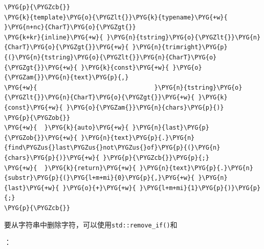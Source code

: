 \begin{codeblockbg}
\begin{Verbatim}[commandchars=\\\{\},breaklines=true,breakanywhere=true,fontsize=\codefont,xleftmargin=17bp]
\PYG{p}{\PYGZcb{}}
\PYG{k}{template}\PYG{o}{\PYGZlt{}}\PYG{k}{typename}\PYG{+w}{ }\PYG{n+nc}{CharT}\PYG{o}{\PYGZgt{}}
\PYG{k+kr}{inline}\PYG{+w}{ }\PYG{n}{tstring}\PYG{o}{\PYGZlt{}}\PYG{n}{CharT}\PYG{o}{\PYGZgt{}}\PYG{+w}{ }\PYG{n}{trimright}\PYG{p}{(}\PYG{n}{tstring}\PYG{o}{\PYGZlt{}}\PYG{n}{CharT}\PYG{o}{\PYGZgt{}}\PYG{+w}{ }\PYG{k}{const}\PYG{+w}{ }\PYG{o}{\PYGZam{}}\PYG{n}{text}\PYG{p}{,}
\PYG{+w}{                                }\PYG{n}{tstring}\PYG{o}{\PYGZlt{}}\PYG{n}{CharT}\PYG{o}{\PYGZgt{}}\PYG{+w}{ }\PYG{k}{const}\PYG{+w}{ }\PYG{o}{\PYGZam{}}\PYG{n}{chars}\PYG{p}{)}
\PYG{p}{\PYGZob{}}
\PYG{+w}{  }\PYG{k}{auto}\PYG{+w}{ }\PYG{n}{last}\PYG{p}{\PYGZob{}}\PYG{+w}{ }\PYG{n}{text}\PYG{p}{.}\PYG{n}{find\PYGZus{}last\PYGZus{}not\PYGZus{}of}\PYG{p}{(}\PYG{n}{chars}\PYG{p}{)}\PYG{+w}{ }\PYG{p}{\PYGZcb{}}\PYG{p}{;}
\PYG{+w}{  }\PYG{k}{return}\PYG{+w}{ }\PYG{n}{text}\PYG{p}{.}\PYG{n}{substr}\PYG{p}{(}\PYG{l+m+mi}{0}\PYG{p}{,}\PYG{+w}{ }\PYG{n}{last}\PYG{+w}{ }\PYG{o}{+}\PYG{+w}{ }\PYG{l+m+mi}{1}\PYG{p}{)}\PYG{p}{;}
\PYG{p}{\PYGZcb{}}
\end{Verbatim}
\end{codeblockbg}



要从字符串中删除字符，可以使用\texttt{std::\allowbreak{}remove\_\allowbreak{}if()}和



：



